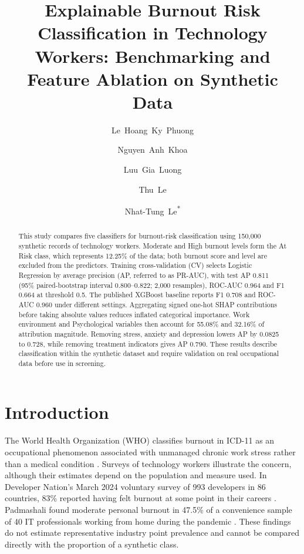 \documentclass[runningheads]{llncs}
\begin{document}
\title{Explainable Burnout Risk Classification in Technology Workers: Benchmarking and Feature Ablation on Synthetic Data}
\author{\mbox{Le Hoang Ky Phuong} \and \mbox{Nguyen Anh Khoa} \and \mbox{Luu Gia Luong} \and \mbox{Thu Le} \and \mbox{Nhat-Tung Le\textsuperscript{*}}}
\maketitle
\begin{abstract}
This study compares five classifiers for burnout-risk classification using 150,000 synthetic records of technology workers. Moderate and High burnout levels form the At Risk class, which represents 12.25\% of the data; both burnout score and level are excluded from the predictors. Training cross-validation (CV) selects Logistic Regression by average precision (AP, referred to as PR-AUC), with test AP 0.811 (95\% paired-bootstrap interval 0.800--0.822; 2,000 resamples), ROC-AUC 0.964 and F1 0.664 at threshold 0.5. The published XGBoost baseline reports F1 0.708 and ROC-AUC 0.960 under different settings. Aggregating signed one-hot SHAP contributions before taking absolute values reduces inflated categorical importance. Work environment and Psychological variables then account for 55.08\% and 32.16\% of attribution magnitude. Removing stress, anxiety and depression lowers AP by 0.0825 to 0.728, while removing treatment indicators gives AP 0.790. These results describe classification within the synthetic dataset and require validation on real occupational data before use in screening.
\end{abstract}

\FloatBarrier
\section{Introduction}
The World Health Organization (WHO) classifies burnout in ICD-11 as an occupational phenomenon associated with unmanaged chronic work stress rather than a medical condition \cite{who}. Surveys of technology workers illustrate the concern, although their estimates depend on the population and measure used. In Developer Nation's March 2024 voluntary survey of 993 developers in 86 countries, 83\% reported having felt burnout at some point in their careers \cite{wellness}. Padmashali found moderate personal burnout in 47.5\% of a convenience sample of 40 IT professionals working from home during the pandemic \cite{padmashali}. These findings do not estimate representative industry point prevalence and cannot be compared directly with the proportion of a synthetic class.
\end{document}

